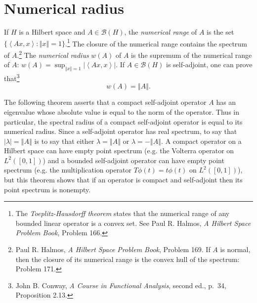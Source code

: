 \documentclass{article}
\newcommand{\inner}[2]{\left\langle #1, #2 \right\rangle}
\newcommand{\norm}[1]{\left\Vert #1 \right\Vert}
\theoremstyle{definition}
\begin{document}
\section{Numerical radius}
If $H$ is a Hilbert space and
 $A \in \mathscr{B}(H)$, the {\em numerical range} of $A$ is the set $\{\inner{Ax}{x}:\norm{x}=1\}$.\footnote{The {\em Toeplitz-Hausdorff theorem} states that
the numerical range of any bounded linear operator is a convex set. See Paul R. Halmos, {\em A Hilbert Space Problem Book}, Problem 166.} 
The closure of the numerical range contains the spectrum of $A$.\footnote{Paul R. Halmos, {\em A Hilbert Space Problem Book}, Problem 169. If $A$
is normal, then the closure of its numerical range is the convex hull of the spectrum: Problem 171.}
The {\em numerical radius} $w(A)$ of $A$ is the supremum of the numerical range of $A$: $w(A)=\sup_{\norm{x}=1} |\inner{Ax}{x}|$.
If $A \in \mathscr{B}(H)$ is self-adjoint, one can prove that\footnote{John B. Conway,
{\em A Course in Functional Analysis}, second ed., p.~34, Proposition 2.13.}
\[
w(A) = \norm{A}.
\]

The following theorem asserts that a compact self-adjoint operator $A$ has an eigenvalue whose absolute value is equal to the norm of the operator.
Thus in particular, the spectral radius of a compact self-adjoint operator is equal to its numerical radius.
Since a self-adjoint operator has real spectrum, to say that $|\lambda|=\norm{A}$ is to say that either $\lambda=\norm{A}$ or $\lambda=-\norm{A}$.
A compact operator on a Hilbert space can have empty point spectrum (e.g.  the Volterra operator on $L^2([0,1])$) and a bounded self-adjoint
operator can have empty point spectrum (e.g. the multiplication operator $T\phi(t)=t\phi(t)$ on
$L^2([0,1])$), but this theorem shows that if an operator is compact and self-adjoint then its point spectrum is nonempty.
\end{document}
